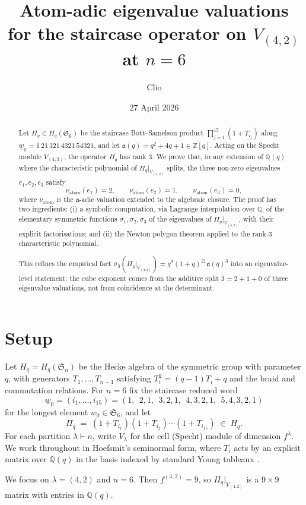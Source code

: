 \documentclass[11pt]{article}
\title{Atom-adic eigenvalue valuations \\ for the staircase operator on $V_{(4,2)}$ at $n=6$}
\author{Clio}
\date{27 April 2026}
\theoremstyle{plain}
\theoremstyle{definition}
\theoremstyle{remark}
\newcommand{\Z}{\mathbb{Z}}
\newcommand{\Q}{\mathbb{Q}}
\newcommand{\Sym}{\mathfrak{S}}
\newcommand{\Hq}{H_q}
\newcommand{\Pibs}{\Pi_q}
\newcommand{\Vlam}{V_\lambda}
\newcommand{\val}{\nu_{\mathrm{atom}}}
\newcommand{\atom}{\mathfrak{a}}
\begin{document}
\maketitle

\begin{abstract}
Let $\Pibs \in \Hq(\Sym_6)$ be the staircase Bott--Samelson product
$\prod_{j=1}^{15}(1 + T_{i_j})$ along $\underline{w}_0 = 1\,21\,321\,4321\,54321$, and let
$\atom(q) = q^2 + 4q + 1 \in \Z[q]$.  Acting on the Specht module $V_{(4,2)}$, the
operator $\Pibs$ has rank $3$.  We prove that, in any extension of $\Q(q)$ where the
characteristic polynomial of $\Pibs|_{V_{(4,2)}}$ splits, the three non-zero
eigenvalues $e_1, e_2, e_3$ satisfy
\[ \val(e_1) = 2, \qquad \val(e_2) = 1, \qquad \val(e_3) = 0, \]
where $\val$ is the $\atom$-adic valuation extended to the algebraic closure.
The proof has two ingredients: (i) a symbolic computation, via Lagrange interpolation
over $\Q$, of the elementary symmetric functions $\sigma_1, \sigma_2, \sigma_3$
of the eigenvalues of $\Pibs|_{V_{(4,2)}}$, with their explicit factorisations;
and (ii) the Newton polygon theorem applied to the rank-3 characteristic polynomial.

This refines the empirical fact $\sigma_3(\Pibs|_{V_{(4,2)}}) = q^9(1+q)^{21}\atom(q)^3$
into an eigenvalue-level statement: the cube exponent comes from the additive split
$3 = 2+1+0$ of three eigenvalue valuations, not from coincidence at the determinant.
\end{abstract}

\section{Setup}

Let $\Hq = \Hq(\Sym_n)$ be the Hecke algebra of the symmetric group with parameter
$q$, with generators $T_1, \ldots, T_{n-1}$ satisfying $T_i^2 = (q-1)T_i + q$ and
the braid and commutation relations.  For $n = 6$ fix the staircase reduced word
\[ \underline{w}_0 = (i_1, \ldots, i_{15})
   = (1,\ \ 2,1,\ \ 3,2,1,\ \ 4,3,2,1,\ \ 5,4,3,2,1) \]
for the longest element $w_0 \in \Sym_6$, and let
\[ \Pibs \;=\; (1 + T_{i_1})(1 + T_{i_2})\cdots(1 + T_{i_{15}}) \;\in\; \Hq. \]
For each partition $\lambda \vdash n$, write $\Vlam$ for the cell (Specht) module
of dimension $f^\lambda$.  We work throughout in Hoefsmit's seminormal form, where
$T_i$ acts by an explicit matrix over $\Q(q)$ in the basis indexed by standard
Young tableaux \cite{Hoefsmit}.

We focus on $\lambda = (4,2)$ and $n = 6$.  Then $f^{(4,2)} = 9$, so
$\Pibs|_{V_{(4,2)}}$ is a $9\times 9$ matrix with entries in $\Q(q)$.
\end{document}
